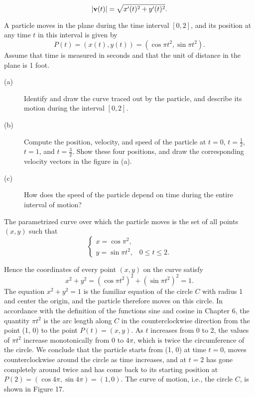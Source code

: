 \begin{equation}
|\mbox{\bf{v}}(t)| = \sqrt{x'(t)^2 + y'(t)^2}.   
\label{eq10.5.3}
\end{equation}
\begin{example} A particle moves in the plane during the time interval $[0, 2]$, and its position at any time $t$ in this interval is given by
$$
P(t) = (x(t), y(t)) = (\cos \pi t^2, \sin \pi t^2).
$$
Assume that time is measured in seconds and that the unit of distance in the plane is 1 foot.
\smallskip

\begin{description}
\item[(a)] Identify and draw the curve traced out by the particle, and describe its motion during the interval $[0, 2]$.
\item[(b)] Compute the position, velocity, and speed of the particle at $t = 0$, $t = \frac{1}{2}$, $t = 1$, and $t = \frac{3}{2}$. Show these four positions, and draw the corresponding velocity vectors in the figure in (a).
\item[(c)] How does the speed of the particle depend on time during the entire interval of motion?

\end{description}
\medskip

The parametrized curve over which the particle moves is the set of all points $(x, y)$ such that
$$
\left \{ \begin{array}{l}
x = \cos \pi ^2, \\
y = \sin \pi t^2,     \;\;\;       0 \leq t \leq 2.
\end{array}
\right .
$$

\noindent Hence the coordinates of every point $(x, y)$ on the curve satisfy
$$
x^2 + y^2 = (\cos \pi t^2)^2 + (\sin \pi t^2)^2 = 1.
$$
The equation $x^2 + y^2 = 1$ is the familiar equation of the circle $C$ with radius 1 and center the origin, and the particle therefore moves on this circle. In accordance with the definition of the functions sine and cosine in Chapter 6, the quantity $\pi t^2$ is the arc length along $C$ in the counterclockwise direction from the point (1, 0) to the point $P(t) = (x, y)$. As $t$ increases from 0 to 2, the values of $\pi t^2$ increase monotonically from 0 to $4 \pi$, which is twice the circumference of the circle. We conclude that the particle starts from (1, 0) at time $t = 0$, moves counterclockwise around the circle as time increases, and at $t = 2$ has gone completely around twice and has come back to its starting position at $P(2) = (\cos 4 \pi, \sin 4 \pi) = (1, 0)$. The curve of motion, i.e., the circle $C$, is shown in Figure 17.


\end{example}

